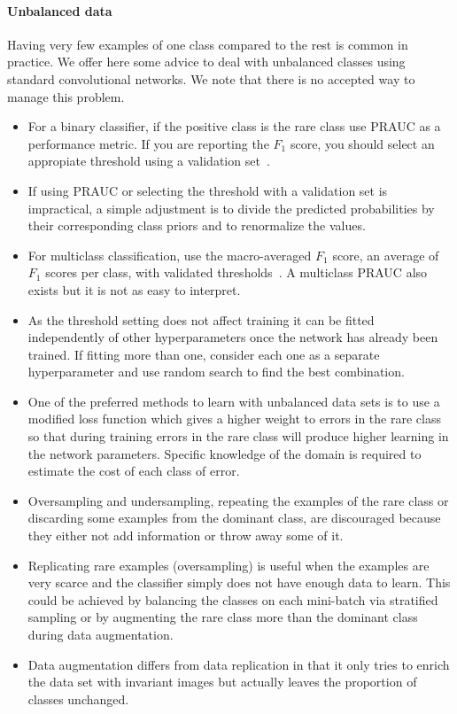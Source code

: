 \paragraph{Unbalanced data}
Having very few examples of one class compared to the rest is common in practice. We offer here some advice to deal with unbalanced classes using standard convolutional networks. We note that there is no accepted way to manage this problem.
\begin{itemize}
	\item For a binary classifier, if the positive class is the rare class use PRAUC as a performance metric. If you are reporting the $F_1$ score, you should select an appropiate threshold using a validation set~\cite{Davis2006}.

	\item If using PRAUC or selecting the threshold with a validation set is impractical, a simple adjustment is to divide the predicted probabilities by their corresponding class priors and to renormalize the values.

	\item For multiclass classification, use the macro-averaged $F_1$ score, an average of $F_1$ scores per class, with validated thresholds~\cite{Ozgur2005}. A multiclass PRAUC also exists but it is not as easy to interpret.

	\item As the threshold setting does not affect training it can be fitted independently of other hyperparameters once the network has already been trained. If fitting more than one, consider each one as a separate hyperparameter and use random search to find the best combination.

	\item One of the preferred methods to learn with unbalanced data sets is to use a modified loss function which gives a higher weight to errors in the rare class so that during training errors in the rare class will produce higher learning in the network parameters. Specific knowledge of the domain is required to estimate the cost of each class of error.

	\item Oversampling and undersampling, repeating the examples of the rare class or discarding some examples from the dominant class, are discouraged because they either not add information or throw away some of it.

	\item Replicating rare examples (oversampling) is useful when the examples are very scarce and the classifier simply does not have enough data to learn. This could be achieved by balancing the classes on each mini-batch via stratified sampling or by augmenting the rare class more than the dominant class during data augmentation.

	\item Data augmentation differs from data replication in that it only tries to enrich the data set with invariant images but actually leaves the proportion of classes unchanged.
\end{itemize}

